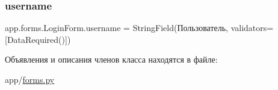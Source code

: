 \mbox{\label{classapp_1_1forms_1_1_login_form_acc32a2914184aa30d464bf3ae29d3fe8}} 
\subsubsection{\texorpdfstring{username}{username}}
{\footnotesize\ttfamily app.\+forms.\+Login\+Form.\+username = String\+Field(\textquotesingle{}Пользователь\textquotesingle{}, validators=\mbox{[}Data\+Required()\mbox{]})\hspace{0.3cm}{\ttfamily [static]}}



Объявления и описания членов класса находятся в файле\+:\begin{DoxyCompactItemize}
\item 
app/\mbox{\hyperlink{forms_8py}{forms.\+py}}\end{DoxyCompactItemize}

